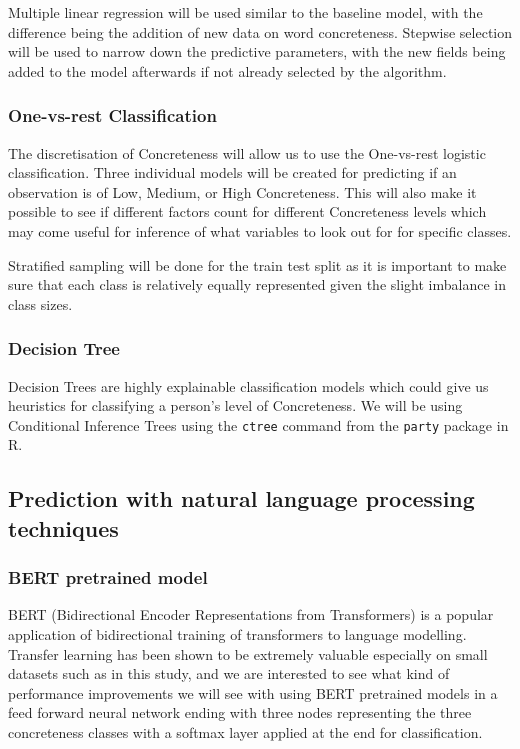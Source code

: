 \documentclass[12pt, a4paper]{article}
\begin{document}
Multiple linear regression will be used similar to the baseline model, with the difference being the addition of new data on word concreteness. Stepwise selection will be used to narrow down the predictive parameters, with the new fields being added to the model afterwards if not already selected by the algorithm. 


\subsubsection{One-vs-rest Classification}
The discretisation of Concreteness will allow us to use the One-vs-rest logistic classification. Three individual models will be created for predicting if an observation is of Low, Medium, or High Concreteness. This will also make it possible to see if different factors count for different Concreteness levels which may come useful for inference of what variables to look out for for specific classes. 

Stratified sampling will be done for the train test split as it is important to make sure that each class is relatively equally represented given the slight imbalance in class sizes.

\subsubsection{Decision Tree}
Decision Trees are highly explainable classification models which could give us heuristics for classifying a person's level of Concreteness. We will be using Conditional Inference Trees \cite{ctree} using the \lstinline{ctree} command  from the \lstinline{party} package in R.

\subsection{Prediction with natural language processing techniques}

\subsubsection{BERT pretrained model}
BERT (Bidirectional Encoder Representations from Transformers) \cite{bert} is a popular application of bidirectional training of transformers to language modelling. Transfer learning has been shown to be extremely valuable especially on small datasets such as in this study, and we are interested to see what kind of performance improvements we will see with using BERT pretrained models in a feed forward neural network ending with three nodes representing the three concreteness classes with a softmax layer applied at the end for classification.
\end{document}

